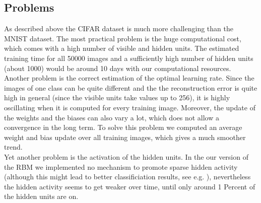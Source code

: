 \documentclass[a4paper]{scrartcl}
\begin{document}
\subsection{Problems}
As described above the CIFAR dataset is much more challenging than the MNIST dataset. The most practical problem is the huge computational cost, which comes with a high number of visible and hidden units. The estimated training time for all 50000 images and a sufficiently high number of hidden units (about 1000) would be around 10 days with our computational resources.\\
Another problem is the correct estimation of the optimal learning rate. Since the images of one class can be quite different and the the reconstruction error is quite high in general (since the visible units take values up to 256), it is highly oscillating when it is computed for every training image. Moreover, the update of the weights and the biases can also vary a lot, which does not allow a convergence in the long term. To solve this problem we computed an average weight and bias update over all training images, which gives a much smoother trend. \\
Yet another problem is the activation of the hidden units. In the our version of the RBM we implemented no mechanism to promote sparse hidden activity (although this might lead to better classificiation results, see e.g. \cite{Larochelle}), nevertheless the hidden activity seems to get weaker over time, until only around 1 Percent of the hidden units are on.
\newpage
\end{document}
